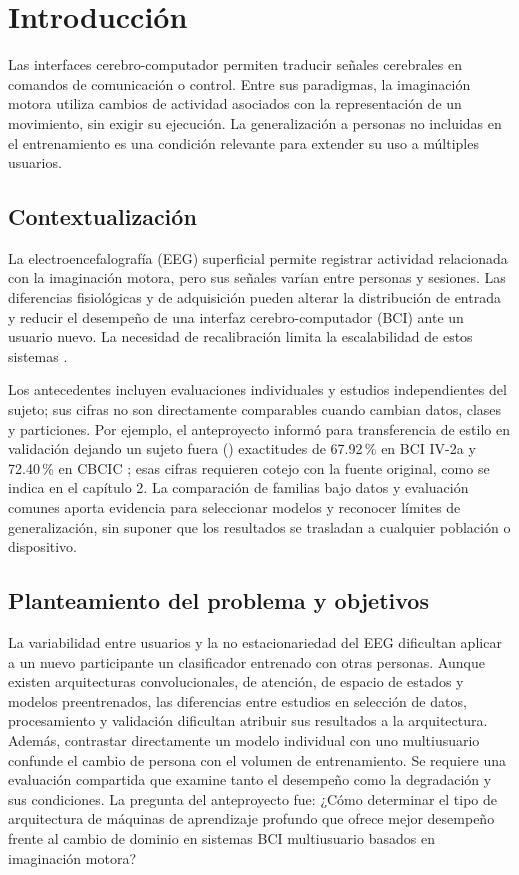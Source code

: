 \chapter{Introducción}
\label{cap:introduccion}
Las interfaces cerebro-computador permiten traducir señales cerebrales en comandos de comunicación o control. Entre sus paradigmas, la imaginación motora utiliza cambios de actividad asociados con la representación de un movimiento, sin exigir su ejecución. La generalización a personas no incluidas en el entrenamiento es una condición relevante para extender su uso a múltiples usuarios.

\section{Contextualización}
La electroencefalografía (EEG) superficial permite registrar actividad relacionada con la imaginación motora, pero sus señales varían entre personas y sesiones. Las diferencias fisiológicas y de adquisición pueden alterar la distribución de entrada y reducir el desempeño de una interfaz cerebro-computador (BCI) ante un usuario nuevo. La necesidad de recalibración limita la escalabilidad de estos sistemas \cite{li2026survey,huang2023discrepancy}.

Los antecedentes incluyen evaluaciones individuales y estudios independientes del sujeto; sus cifras no son directamente comparables cuando cambian datos, clases y particiones. Por ejemplo, el anteproyecto informó para transferencia de estilo en validación dejando un sujeto fuera (\loso{}) exactitudes de 67.92\,\% en BCI IV-2a y 72.40\,\% en CBCIC \cite{han2026source}; esas cifras requieren cotejo con la fuente original, como se indica en el capítulo 2. La comparación de familias bajo datos y evaluación comunes aporta evidencia para seleccionar modelos y reconocer límites de generalización, sin suponer que los resultados se trasladan a cualquier población o dispositivo.
\section{Planteamiento del problema y objetivos}
La variabilidad entre usuarios y la no estacionariedad del EEG dificultan aplicar a un nuevo participante un clasificador entrenado con otras personas. Aunque existen arquitecturas convolucionales, de atención, de espacio de estados y modelos preentrenados, las diferencias entre estudios en selección de datos, procesamiento y validación dificultan atribuir sus resultados a la arquitectura. Además, contrastar directamente un modelo individual con uno multiusuario confunde el cambio de persona con el volumen de entrenamiento. Se requiere una evaluación compartida que examine tanto el desempeño como la degradación y sus condiciones. La pregunta del anteproyecto fue: ¿Cómo determinar el tipo de arquitectura de máquinas de aprendizaje profundo que ofrece mejor desempeño frente al cambio de dominio en sistemas BCI multiusuario basados en imaginación motora?

